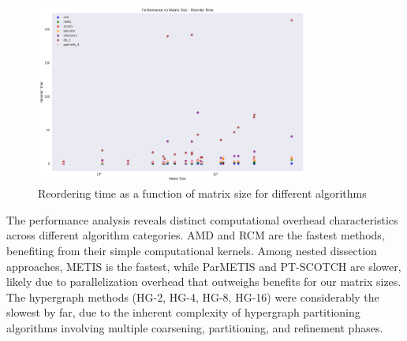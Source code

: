 \begin{figure}[h]
\centering
\includegraphics[width=0.8\textwidth]{fig/res/reorder_time_vs_size.png}
\caption{Reordering time as a function of matrix size for different algorithms}
\label{fig:reordering-time-vs-size}
\end{figure}

The performance analysis reveals distinct computational overhead characteristics across different algorithm categories. AMD and RCM are the fastest methods, benefiting from their simple computational kernels. Among nested dissection approaches, METIS is the fastest, while ParMETIS and PT-SCOTCH are slower, likely due to parallelization overhead that outweighs benefits for our matrix sizes. The hypergraph methods (HG-2, HG-4, HG-8, HG-16) were considerably the slowest by far, due to the inherent complexity of hypergraph partitioning algorithms involving multiple coarsening, partitioning, and refinement phases.



